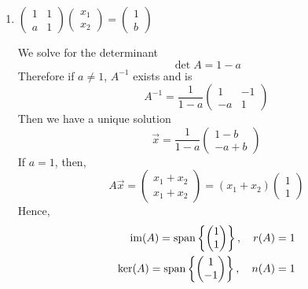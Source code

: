 \documentclass{article}
\numberwithin{equation}{section}
\begin{document}
\begin{eg}\leavevmode
    \begin{enumerate}[label=(\arabic*)]
        \item $\begin{pmatrix}
            1 & 1 \\
            a & 1
        \end{pmatrix}
        \begin{pmatrix}
            x_1 \\ x_2
        \end{pmatrix}=
        \begin{pmatrix}
            1 \\ b
        \end{pmatrix}$

        We solve for the determinant
        \[
            \det A = 1 - a
        \]
        Therefore if $a \neq 1$, $A^{-1}$ exists and is
        \[
            A^{-1} = \frac{1}{1-a} \begin{pmatrix}
                1 & -1 \\
                -a & 1 
            \end{pmatrix}
        \]
        Then we have a unique solution
        \[
            \vec x = \frac{1}{1-a} \begin{pmatrix}
                1- b \\
                -a + b 
            \end{pmatrix}
        \]
        If $a = 1$, then,
        \[
            A \vec x = \begin{pmatrix}
                x_1 + x_2 \\
                x_1 + x_2
            \end{pmatrix} = (x_1 + x_2) \begin{pmatrix}
                1 \\ 1
            \end{pmatrix}
        \]
        Hence,
        \begin{align*}
            \operatorname{im}(A) = \operatorname{span} \left\{ \begin{pmatrix}
                1 \\ 1
            \end{pmatrix} \right\}, \quad r(A) = 1 \\
            \ker(A) = \operatorname{span} \left\{ \begin{pmatrix}
                1 \\ -1
            \end{pmatrix} \right\}, \quad n(A) = 1
        \end{align*}


\end{enumerate}
\end{eg}
\end{document}

